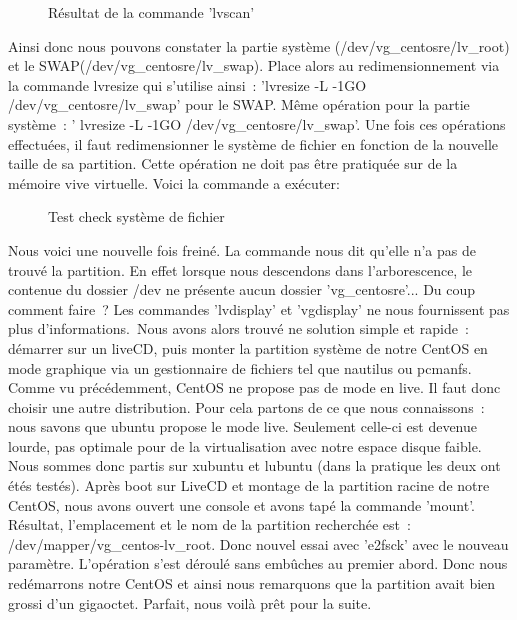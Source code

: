 \documentclass[12pt]{article}
\begin{document}
\begin{figure}[H]
\caption{Résultat de la commande 'lvscan'}
\label{fig:identification}
\end{figure}

Ainsi donc nous pouvons constater la partie système (/dev/vg\_centosre/lv\_root) et le SWAP(/dev/vg\_centosre/lv\_swap). Place alors au redimensionnement via la commande lvresize qui s'utilise ainsi : 'lvresize -L -1GO /dev/vg\_centosre/lv\_swap' pour le SWAP. Même opération pour la partie système : ' lvresize -L -1GO /dev/vg\_centosre/lv\_swap'. Une fois ces opérations effectuées, il faut redimensionner le système de fichier en fonction de la nouvelle taille de sa partition. Cette opération ne doit pas être pratiquée sur de la mémoire vive virtuelle. Voici la commande a exécuter:

\begin{figure}[H]
\caption{Test check système de fichier}
\label{fig:identification}
\end{figure}

Nous voici une nouvelle fois freiné. La commande nous dit qu'elle n'a pas de trouvé la partition. En effet lorsque nous descendons dans l’arborescence, le contenue du dossier /dev ne présente aucun dossier 'vg\_centosre'... Du coup comment faire ? Les commandes 'lvdisplay' et 'vgdisplay' ne nous fournissent pas plus d'informations. Nous avons alors trouvé ne solution simple et rapide : démarrer sur un liveCD, puis monter la partition système de notre CentOS en mode graphique via un gestionnaire de fichiers tel que nautilus ou pcmanfs. Comme vu précédemment, CentOS ne propose pas de mode en live. Il faut donc choisir une autre distribution. Pour cela partons de ce que nous connaissons : nous savons que ubuntu propose le mode live. Seulement celle-ci est devenue lourde, pas optimale pour de la virtualisation avec notre espace disque faible. Nous sommes donc partis sur xubuntu et lubuntu (dans la pratique les deux ont étés testés). Après boot sur LiveCD et montage de la partition racine de notre CentOS, nous avons ouvert une console et avons tapé la commande 'mount'. Résultat, l'emplacement et le nom de la partition recherchée est : /dev/mapper/vg\_centos-lv\_root. Donc nouvel essai avec 'e2fsck' avec le nouveau paramètre. L'opération s'est déroulé sans embûches au premier abord. Donc nous redémarrons notre CentOS et ainsi nous remarquons que la partition avait bien grossi d'un gigaoctet. Parfait, nous voilà prêt pour la suite.
\end{document}
